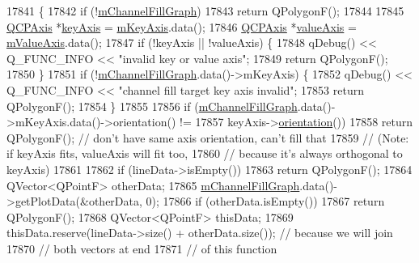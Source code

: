 \begin{DoxyCode}
17841                                                                       \{
17842   \textcolor{keywordflow}{if} (!\hyperlink{class_q_c_p_graph_a2f1777c7accf8244fc640c33f0b04577}{mChannelFillGraph})
17843     \textcolor{keywordflow}{return} QPolygonF();
17844 
17845   \hyperlink{class_q_c_p_axis}{QCPAxis} *\hyperlink{class_q_c_p_abstract_plottable_a72c7a09c22963f2c943f07112b311103}{keyAxis} = \hyperlink{class_q_c_p_abstract_plottable_a426f42e254d0f8ce5436a868c61a6827}{mKeyAxis}.data();
17846   \hyperlink{class_q_c_p_axis}{QCPAxis} *\hyperlink{class_q_c_p_abstract_plottable_a3106f9d34d330a6097a8ec5905e5b519}{valueAxis} = \hyperlink{class_q_c_p_abstract_plottable_a2901452ca4aea911a1827717934a4bda}{mValueAxis}.data();
17847   \textcolor{keywordflow}{if} (!keyAxis || !valueAxis) \{
17848     qDebug() << Q\_FUNC\_INFO << \textcolor{stringliteral}{"invalid key or value axis"};
17849     \textcolor{keywordflow}{return} QPolygonF();
17850   \}
17851   \textcolor{keywordflow}{if} (!\hyperlink{class_q_c_p_graph_a2f1777c7accf8244fc640c33f0b04577}{mChannelFillGraph}.data()->mKeyAxis) \{
17852     qDebug() << Q\_FUNC\_INFO << \textcolor{stringliteral}{"channel fill target key axis invalid"};
17853     \textcolor{keywordflow}{return} QPolygonF();
17854   \}
17855 
17856   \textcolor{keywordflow}{if} (\hyperlink{class_q_c_p_graph_a2f1777c7accf8244fc640c33f0b04577}{mChannelFillGraph}.data()->mKeyAxis.data()->orientation() !=
17857       keyAxis->\hyperlink{class_q_c_p_axis_a57483f2f60145ddc9e63f3af53959265}{orientation}())
17858     \textcolor{keywordflow}{return} QPolygonF(); \textcolor{comment}{// don't have same axis orientation, can't fill that}
17859                         \textcolor{comment}{// (Note: if keyAxis fits, valueAxis will fit too,}
17860                         \textcolor{comment}{// because it's always orthogonal to keyAxis)}
17861 
17862   \textcolor{keywordflow}{if} (lineData->isEmpty())
17863     \textcolor{keywordflow}{return} QPolygonF();
17864   QVector<QPointF> otherData;
17865   \hyperlink{class_q_c_p_graph_a2f1777c7accf8244fc640c33f0b04577}{mChannelFillGraph}.data()->getPlotData(&otherData, 0);
17866   \textcolor{keywordflow}{if} (otherData.isEmpty())
17867     \textcolor{keywordflow}{return} QPolygonF();
17868   QVector<QPointF> thisData;
17869   thisData.reserve(lineData->size() + otherData.size()); \textcolor{comment}{// because we will join}
17870                                                          \textcolor{comment}{// both vectors at end}
17871                                                          \textcolor{comment}{// of this function}

\end{DoxyCode}
